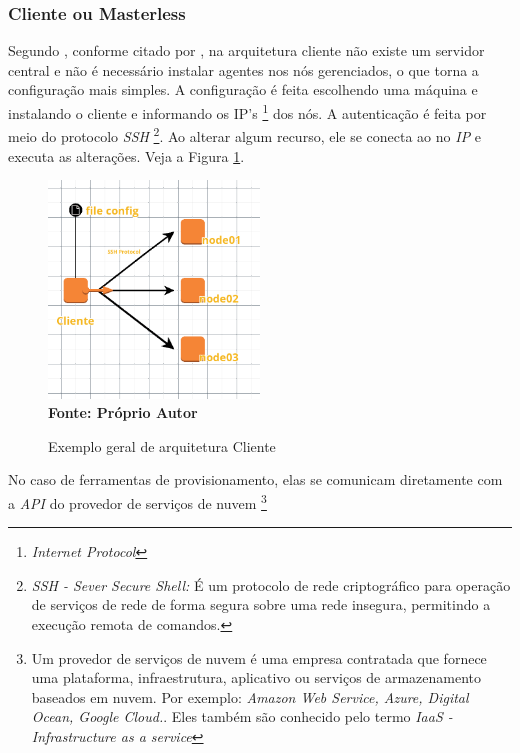 \subsubsection{Cliente ou Masterless} \label{semagent}
Segundo , conforme citado por , na arquitetura cliente não existe um servidor central e não é necessário instalar agentes nos nós gerenciados, o que torna a configuração mais simples. A configuração é feita escolhendo uma máquina e instalando o cliente e informando os IP's \footnote{\textit{Internet Protocol}} dos nós. A autenticação é feita por meio do protocolo \textit{SSH} \footnote{\textit{SSH - Sever Secure Shell:}  É um protocolo de rede criptográfico para operação de serviços de rede de forma segura sobre uma rede insegura, permitindo a execução remota de comandos.}. Ao alterar algum recurso, ele se conecta ao no \textit{IP} e executa as alterações.  Veja a Figura  \ref{fig:figura3}. 

\begin{figure}[H]
	\centering	
	\caption[\hspace{0.1cm}Exemplo arquitetura Cliente]{Exemplo geral de arquitetura Cliente}
	\vspace{-0.4cm}
	\includegraphics[width=0.5\textwidth]{figuras/cliente.png}
	 \vspace{-0.2cm}
	\\\textbf{\footnotesize Fonte: Próprio Autor}
	\label{fig:figura3}
\end{figure}
\vspace{-0.5cm}


No caso de ferramentas de provisionamento, elas se comunicam diretamente com a \textit{API} do provedor de serviços de nuvem \footnote{Um provedor de serviços de nuvem é uma empresa contratada que fornece uma plataforma, infraestrutura, aplicativo ou serviços de armazenamento baseados em nuvem. Por exemplo: \textit{Amazon Web Service, Azure, Digital Ocean, Google Cloud.}. Eles também são conhecido pelo termo \textit{IaaS - Infrastructure as a service} }


